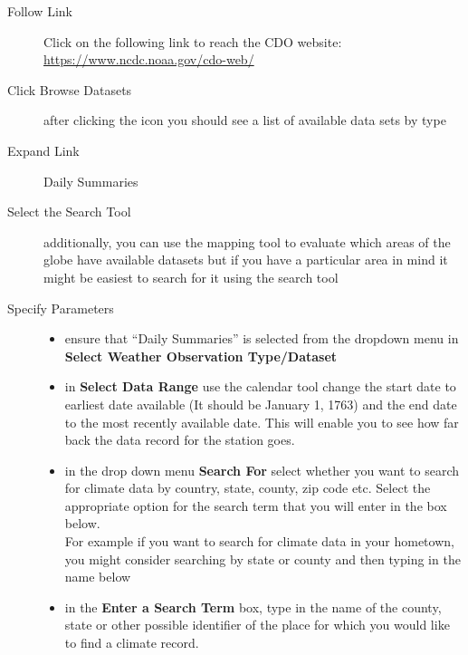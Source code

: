 \documentclass{article}\usepackage[]{graphicx}\usepackage[]{color}
\begin{document}
\begin{description}
  \item[Follow Link] Click on the following link to reach the CDO website: \\ \url{https://www.ncdc.noaa.gov/cdo-web/} 
  \item[Click Browse Datasets] after clicking the icon you should see a list of available data sets by type
  \item[Expand Link] Daily Summaries
  \item[Select the Search Tool] additionally, you can use the mapping tool to evaluate which areas of the globe have available datasets but if you have a particular area in mind it might be easiest to search for it using the search tool
  \item[Specify Parameters] \hspace{30mm}
  
  \begin{itemize}
    \item ensure that ``Daily Summaries'' is selected from the dropdown menu in \textbf{Select Weather Observation Type/Dataset}
    \item in \textbf{Select Data Range} use the calendar tool change the start date to earliest date available (It should be January 1, 1763) and the end date to the most recently available date. This will enable you to see how far back the data record for the station goes.  
    \item in the drop down menu \textbf{Search For} select whether you want to search for climate data by country, state, county, zip code etc. Select the appropriate option for the search term that you will enter in the box below. \\ For example if you want to search for climate data in your hometown, you might consider searching by state or county and then typing in the name below
    \item in the \textbf{Enter a Search Term} box, type in the name of the county, state or other possible identifier of the place for which you would like to find a climate record.
    \end{itemize}


\end{description}
\end{document}
